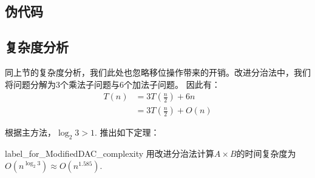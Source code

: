 \subsection{伪代码}
\begin{algorithm}
    \DontPrintSemicolon{}
    \caption{ModifiedDAC\label{label_for_pseudo_ModifiedDAC}}
\end{algorithm}

\subsection{复杂度分析}
同上节的复杂度分析，我们此处也忽略移位操作带来的开销。改进分治法中，我们将问题分解为3个乘法子问题与6个加法子问题。
因此有：
\begin{displaymath}
    \begin{split}
        T(n)
        &= 3T(\frac{n}{2}) + 6n\\
        &= 3T(\frac{n}{2}) + O(n)
    \end{split}
\end{displaymath}

根据主方法，$\log_2 3 > 1$. 推出如下定理：
\begin{theorem}{}{label_for_ModifiedDAC_complexity}
    用改进分治法计算$A \times B$的时间复杂度为$O(n^{\log_2 3}) \approx O(n^{1.585})$.
\end{theorem}